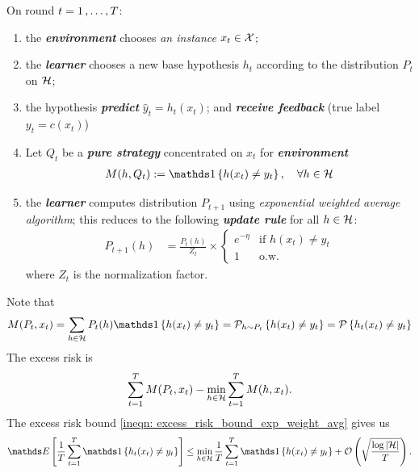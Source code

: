 \documentclass[11pt]{article}
\begin{document}
\begin{itemize}
\begin{remark}[Algorithm]
On round $t = 1 \,{,}\ldots{,}\, T$:
\begin{enumerate}
\item the \emph{\textbf{environment}} chooses \emph{an instance} $x_t \in {\mathcal X}$; 
\item the \emph{\textbf{learner}} chooses a new base hypothesis $h_t$ according to the distribution $P_{t}$ on ${\mathcal H}$; 
\item the hypothesis \emph{\textbf{predict}} $\hat{y}_t = h_t(x_t)$; and \emph{\textbf{receive feedback}} (true label $y_t = c(x_t)$)
\item Let $Q_t$ be a \emph{\textbf{pure strategy}}  concentrated on $x_t$ for  \emph{\textbf{environment}}
\begin{align*}
M(h, Q_t) :=  \ind{h(x_t) \neq y_t},  \quad \forall h\in \cH
\end{align*}
\item the \emph{\textbf{learner}} computes distribution $P_{t+1}$ using \emph{exponential weighted average algorithm}; this reduces to the following \emph{\textbf{update rule}} for all $h \in {\mathcal H}$:
\begin{align*}
P_{t+1}(h) &= \frac{P_t(h)}{Z_t} \times \left\{ \begin{array}{cc}
e^{-\eta} &\text{if } h(x_t) \neq y_t\\
1 & \text{o.w.}
\end{array}
\right.
\end{align*} where $Z_t$ is the normalization factor.
\end{enumerate} Note that
\begin{align*}
M(P_t, x_t) = \sum_{h \in \cH}P_{t}(h)\ind{h(x_t) \neq y_t} = \cP_{h \sim P_t}\set{h(x_t) \neq y_t} = \cP\set{h_t(x_t) \neq y_t}
\end{align*} The excess risk is
\begin{align}
\sum_{t=1}^{T} M(P_t, x_t) - \min_{h \in {\mathcal H}}\sum_{t=1}^{T}M(h, x_t). \label{eqn: excess_risk_online_prediction}
\end{align}
The excess risk bound \eqref{ineqn: excess_risk_bound_exp_weight_avg} gives us
\begin{align*}
\E{}{\frac{1}{T}\sum_{t=1}^{T}\ind{h_t(x_t) \neq y_t}} \le \min_{h \in \cH}\frac{1}{T}\sum_{t=1}^{T}\ind{h(x_t) \neq y_t} + \cO\paren{\sqrt{\frac{\log \abs{\cH}}{T}}}.
\end{align*} 
\end{remark}




\end{itemize}
\end{document}
